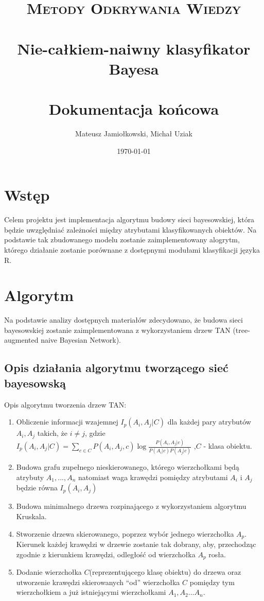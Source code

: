 \documentclass[paper=a4, fontsize=11pt]{scrartcl} %
\title{	
\normalfont \normalsize 
\textsc{Metody Odkrywania Wiedzy} \\ [25pt] %
\horrule{0.5pt} \\[0.4cm] %
\huge Nie-całkiem-naiwny klasyfikator Bayesa \\ %
\horrule{2pt} \\[0.5cm] %
\LARGE Dokumentacja końcowa
}%
\author{Mateusz Jamiołkowski, Michał Uziak} %
\date{\normalsize\today} %
\numberwithin{equation}{section} %
\numberwithin{figure}{section} %
\numberwithin{table}{section} %
\begin{document}
\maketitle %

\newpage

\tableofcontents

\newpage

\section{Wstęp}

Celem projektu jest implementacja algorytmu budowy sieci bayesowskiej, która będzie uwzględniać zależności między atrybutami klasyfikowanych obiektów. Na podstawie tak zbudowanego modelu zostanie zaimplementowany alogrytm, którego działanie zostanie porównane z dostępnymi modułami klasyfikacji języka R.

\section{Algorytm}
Na podstawie analizy dostępnych materiałów zdecydowano, że budowa sieci bayesowskiej zostanie zaimplementowana z wykorzystaniem drzew TAN (tree-augmented naive Bayesian Network). 

\subsection{Opis działania algorytmu tworzącego sieć bayesowską}



Opis algorytmu tworzenia drzew TAN:
\begin{enumerate}
 \item Obliczenie informacji wzajemnej $I_p(A_i,A_j|C)$ dla każdej pary atrybutów $A_i, A_j$ takich, że $i\neq j $, gdzie 
 $I_p(A_i,A_j|C)= \sum_{c \in C}^{} {P(A_i,A_j,c) \log\frac{P(A_i,A_j|c)}{P(A_i|c)P(A_j|c)} } $ ,$C$ - klasa obiektu.
 
 \item  Budowa grafu zupełnego nieskierowanego, którego wierzchołkami będą atrybuty $A_1,... ,A_n$ natomiast waga krawędzi pomiędzy atrybutami $A_i$ i $A_j$ 		będzie równa $I_p(A_i,A_j)$
 
 \item  Budowa minimalnego drzewa rozpinającego z wykorzystaniem algorytmu Kruskala.
 \item  Stworzenie drzewa skierowanego, poprzez wybór jednego wierzchołka $A_p$. Kierunek każdej krawędzi w drzewie zostanie tak dobrany, aby, przechodząc zgodnie z kierunkiem krawędzi, odległość od wierzchołka $A_p$ rosła.
 \item Dodanie wierzchołka $C$(reprezentującego klasę obiektu) do drzewa oraz utworzenie krawędzi skierowanych “od” wierzchołka $C$ pomiędzy tym wierzchołkiem a już istniejącymi wierzchołkami $A_1,A_2...A_n$.
 
\end{enumerate}
\end{document}
